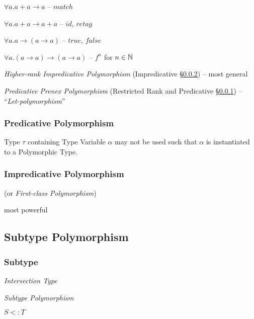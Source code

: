 $\forall a.a + a \rightarrow a$ -- $match$

$\forall a.a + a \rightarrow a + a$ -- $id$, $retag$


$\forall a.a \rightarrow (a \rightarrow a)$ -- $true$, $false$


$\forall a.(a \rightarrow a) \rightarrow (a \rightarrow a)$ -- $f^n$
for $n \in \mathbb{N}$


\asterism


\emph{Higher-rank Impredicative Polymorphism} (Impredicative
\S\ref{sec:impredicative_polymorphism}) -- most general

\emph{Predicative Prenex Polymorphism} (Restricted Rank and
Predicative \S\ref{sec:predicative_polymorphism}) --
``\emph{Let-polymorphism}''



\subsubsection{Predicative Polymorphism}
\label{sec:predicative_polymorphism}

Type $\tau$ containing Type Variable $\alpha$ may not be used such
that $\alpha$ is instantiated to a Polymorphic Type.



\subsubsection{Impredicative Polymorphism}
\label{sec:impredicative_polymorphism}

(or \emph{First-class Polymorphism})

most powerful



\subsection{Subtype Polymorphism}\label{sec:subtype_polymorphism}

\subsubsection{Subtype}\label{sec:subtype}

\emph{Intersection Type}

\emph{Subtype Polymorphism}

$S <: T$

